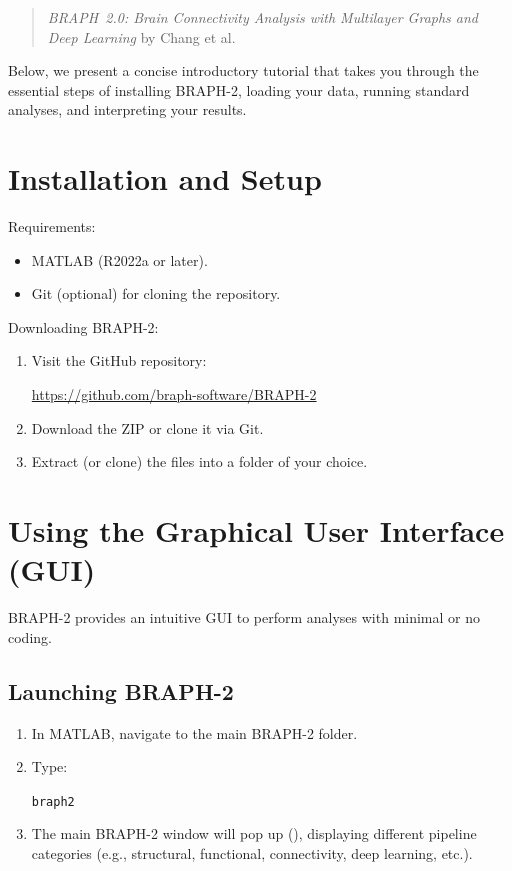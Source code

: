 \documentclass[justified]{tufte-handout}
\begin{document}
\begin{quote}
\emph{BRAPH~2.0: Brain Connectivity Analysis with Multilayer Graphs and Deep Learning} by Chang et al.
\end{quote}

Below, we present a concise introductory tutorial that takes you through the essential steps of installing BRAPH-2, loading your data, running standard analyses, and interpreting your results.

\section{Installation and Setup}

Requirements:
\begin{itemize}

\item MATLAB (R2022a or later).

\item Git (optional) for cloning the repository.

\end{itemize}

Downloading BRAPH-2:
\begin{enumerate}

\item Visit the GitHub repository:

\url{https://github.com/braph-software/BRAPH-2}

\item Download the ZIP or clone it via Git.

\item Extract (or clone) the files into a folder of your choice.

\end{enumerate}

\section{Using the Graphical User Interface (GUI)}

BRAPH-2 provides an intuitive GUI to perform analyses with minimal or no coding.

\subsection{Launching BRAPH-2}

\begin{enumerate}

\item In MATLAB, navigate to the main BRAPH-2 folder.

\item Type:

\lstinline{braph2}

\item The main BRAPH-2 window will pop up (), displaying different pipeline categories (e.g., structural, functional, connectivity, deep learning, etc.).

\end{enumerate}
\end{document}
